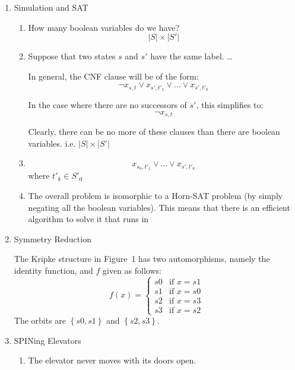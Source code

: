 \documentclass{article}
\begin{document}
\begin{enumerate}
  Prove that the set of states satisfying $AF p$ is the least fixpoint of the function $\tau$ given by $\tau(Z) = p \vee AX Z$.

\begin{proof}
  Claim 1:  $AF p$ is a fixpoint of $\tau$.

  \[\tau(AF p) = p \vee AX(AF p) = p \vee X(AF p) = AF p \]
  Thus $AF p$ is a fixpoint of $\tau$.

  Claim 2: For any fixpoint of $\tau$ $S$, $AF p \supseteq S$.

  Assume to the contrary that this were not the case.  This would mean that
  there exists some computation $Z \in S$ such that $Z \not\in AF p$.
  This would mean that there exists a path for which $p$ is not true,
  or $EG \neg p$.  Now if we take $\tau(Z)$, we get $p \vee AX(EG \neg p)$,
  which is clearly not equivalent.  Thus $S$ is not a fixed-point of $\tau$.
  This contradicts our assumption.
\end{proof}

\item Simulation and SAT
  \begin{enumerate}
    \item How many boolean variables do we have?
      \[ |S| \times |S'| \]
    \item Suppose that two states $s$ and $s'$ have the same label. \dots

      In general, the CNF clause will be of the form:
      \[ \neg x_{s,t} \vee x_{s',t'_1} \vee \dots \vee x_{s',t'_k} \]

      In the case where there are no successors of $s'$, this simplifies to:
      \[ \neg x_{s,t} \]

      Clearly, there can be no more of these clauses than there are boolean
      variables. i.e. $|S| \times |S'|$
    \item
      \[ x_{s_0,t'_1} \vee \dots \vee x_{s',t'_k} \]
      where $t'_k \in S'_0$
    \item The overall problem is isomorphic to a Horn-SAT problem
      (by simply negating all the boolean variables).  This means that there
      is an efficient algorithm to solve it that runs in
  \end{enumerate}
\item Symmetry Reduction

  The Kripke structure in Figure~1 has two automorphisms, namely the identity
  function, and $f$ given as follows:
  \[
  f(x) = \begin{cases}
    s0 &\text{if } x = s1 \\
    s1 &\text{if } x = s0 \\
    s2 &\text{if } x = s3 \\
    s3 &\text{if } x = s2
  \end{cases}
  \]
  The orbits are $\left\{ s0, s1 \right\}$ and $\left\{ s2, s3 \right\}$.
\item SPINing Elevators
  \begin{enumerate}
    \item The elevator never moves with its doors open.


\end{enumerate}
\end{enumerate}
\end{document}
